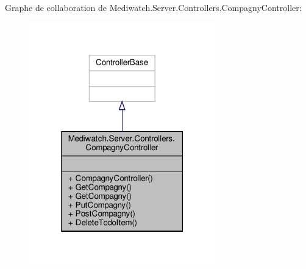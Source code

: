 Graphe de collaboration de Mediwatch.\+Server.\+Controllers.\+Compagny\+Controller\+:\nopagebreak
\begin{figure}[H]
\begin{center}
\leavevmode
\includegraphics[width=229pt]{class_mediwatch_1_1_server_1_1_controllers_1_1_compagny_controller__coll__graph}
\end{center}
\end{figure}

